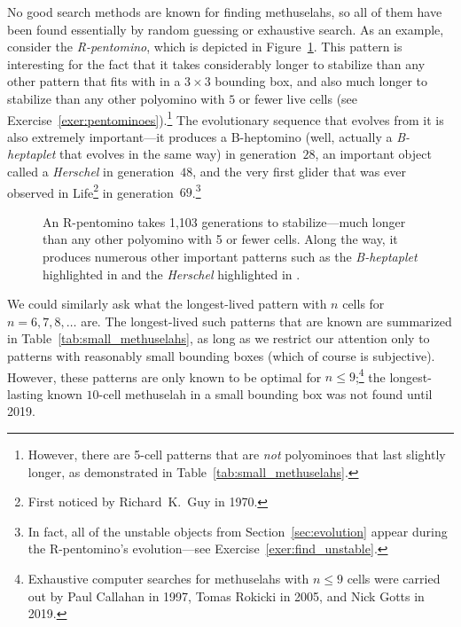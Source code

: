 No good search methods are known for finding methuselahs, so all of them have been found essentially by random guessing or exhaustive search. As an example, consider the \emph{R-pentomino}, which is depicted in Figure~\ref{fig:r_pentomino}. This pattern is interesting for the fact that it takes considerably longer to stabilize than any other pattern that fits with in a $3 \times 3$ bounding box, and also much longer to stabilize than any other polyomino with $5$ or fewer live cells (see Exercise~\ref{exer:pentominoes}).\footnote{However, there are 5-cell patterns that are \emph{not} polyominoes that last slightly longer, as demonstrated in Table~\ref{tab:small_methuselahs}.} The evolutionary sequence that evolves from it is also extremely important---it produces a B-heptomino (well, actually a \emph{B-heptaplet} that evolves in the same way) in generation~$28$, an important object called a \emph{Herschel} in generation~$48$, and the very first glider that was ever observed in Life\footnote{First noticed by Richard~K.~Guy in 1970.} in generation~$69$.\footnote{In fact, all of the unstable objects from Section~\ref{sec:evolution} appear during the R-pentomino's evolution---see Exercise~\ref{exer:find_unstable}.}

\begin{figure}[!htb]
	\centering{}
	\caption{An R-pentomino takes 1,103 generations to stabilize---much longer than any other polyomino with 5 or fewer cells. Along the way, it produces numerous other important patterns such as the \emph{B-heptaplet} highlighted in  and the \emph{Herschel} highlighted in .}\label{fig:r_pentomino}
\end{figure}

We could similarly ask what the longest-lived pattern with $n$ cells for $n = 6, 7, 8, \ldots$ are. The longest-lived such patterns that are known are summarized in Table~\ref{tab:small_methuselahs}, as long as we restrict our attention only to patterns with reasonably small bounding boxes (which of course is subjective). However, these patterns are only known to be optimal for $n \leq 9$;\footnote{Exhaustive computer searches for methuselahs with $n \leq 9$ cells were carried out by Paul Callahan in 1997, Tomas Rokicki in 2005, and Nick Gotts in 2019.} the longest-lasting known $10$-cell methuselah in a small bounding box was not found until 2019.


